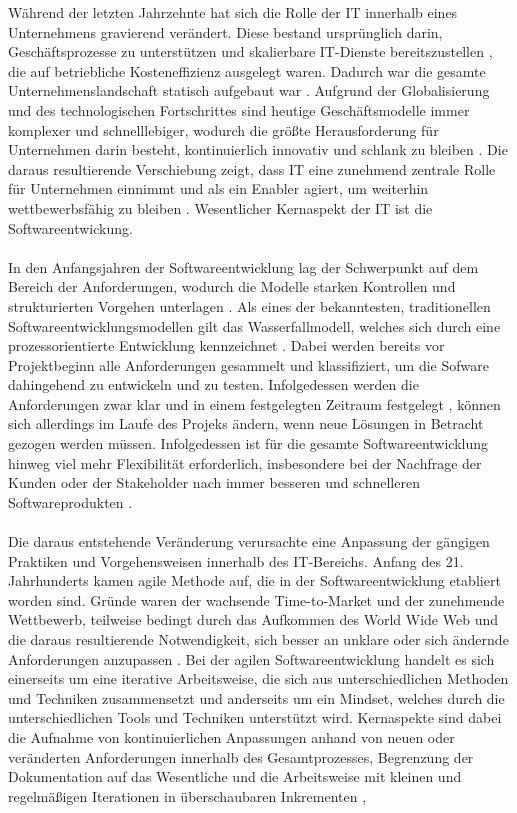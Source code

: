 Während der letzten Jahrzehnte hat sich die Rolle der IT innerhalb eines Unternehmens gravierend verändert. Diese bestand ursprünglich darin, Geschäftsprozesse zu unterstützen und skalierbare IT-Dienste bereitszustellen \cite{haffke_transformative_2017}, die auf betriebliche Kosteneffizienz ausgelegt waren. Dadurch war die gesamte Unternehmenslandschaft statisch aufgebaut war \cite[S. 16]{ravichandran_devops_2016}. Aufgrund der Globalisierung und des technologischen Fortschrittes sind heutige Geschäftsmodelle immer komplexer und schnelllebiger, wodurch die größte Herausforderung für Unternehmen darin besteht, kontinuierlich innovativ und schlank zu bleiben \cite{haffke_transformative_2017}. Die daraus resultierende Verschiebung zeigt, dass IT eine zunehmend zentrale Rolle für Unternehmen einnimmt und als ein Enabler agiert, um weiterhin wettbewerbsfähig zu bleiben \cite{haffke_transformative_2017}. Wesentlicher Kernaspekt der IT ist die Softwareentwickung.\\\\ In den Anfangsjahren der Softwareentwicklung lag der Schwerpunkt auf dem Bereich der Anforderungen, wodurch die Modelle starken Kontrollen und strukturierten Vorgehen unterlagen \cite{kneuper_sixty_2017}. Als eines der bekanntesten, traditionellen Softwareentwicklungsmodellen gilt das Wasserfallmodell, welches sich durch eine prozessorientierte Entwicklung kennzeichnet \cite{bakaji_waterfall_2012}. Dabei werden bereits vor Projektbeginn alle Anforderungen gesammelt und klassifiziert, um die Sofware dahingehend zu entwickeln und zu testen. Infolgedessen werden die Anforderungen zwar klar und in einem festgelegten Zeitraum festgelegt \cite{bakaji_waterfall_2012}, können sich allerdings im Laufe des Projeks ändern, wenn neue Lösungen in Betracht gezogen werden müssen. Infolgedessen ist für die gesamte Softwareentwicklung hinweg viel mehr Flexibilität erforderlich, insbesondere bei der Nachfrage der Kunden oder der Stakeholder nach immer besseren und schnelleren Softwareprodukten \cite[S. 17]{ravichandran_devops_2016}.\\\\ Die daraus entstehende Veränderung verursachte eine Anpassung der gängigen Praktiken und Vorgehensweisen innerhalb des IT-Bereichs. Anfang des 21. Jahrhunderts kamen agile Methode auf, die in der Softwareentwicklung etabliert worden sind. Gründe waren der wachsende Time-to-Market und der zunehmende Wettbewerb, teilweise bedingt durch das Aufkommen des World Wide Web und die daraus resultierende Notwendigkeit, sich besser an unklare oder sich ändernde Anforderungen anzupassen \cite{haffke_transformative_2017}. Bei der agilen Softwareentwicklung handelt es sich einerseits um eine iterative Arbeitsweise, die sich aus unterschiedlichen Methoden und Techniken zusammensetzt und anderseits um ein Mindset, welches durch die unterschiedlichen Tools und Techniken unterstützt wird. Kernaspekte sind dabei die Aufnahme von kontinuierlichen Anpassungen anhand von neuen oder veränderten Anforderungen innerhalb des Gesamtprozesses, Begrenzung der Dokumentation auf das Wesentliche und die Arbeitsweise mit kleinen und regelmäßigen Iterationen in überschaubaren Inkrementen \cite{cohen_introduction_2004}, 